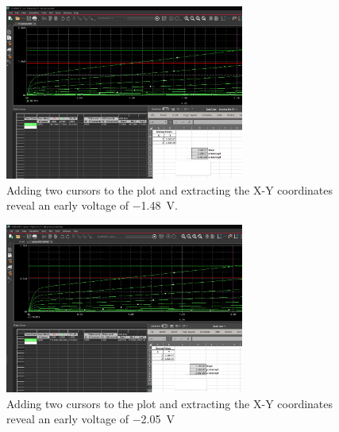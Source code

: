 \documentclass{article}
\begin{document}
	\begin{figure}[H]
	    \centering
	    \includegraphics[width=0.7\textwidth]{nmos-early}
	    \caption{Adding two cursors to the plot and extracting the X-Y coordinates reveal an early voltage of \SI{-1.48}{\volt}.}
	\end{figure}


	\begin{figure}[H]
	    \centering
	    \includegraphics[width=0.7\textwidth]{pmos-early}
	    \caption{Adding two cursors to the plot and extracting the X-Y coordinates reveal an early voltage of \SI{-2.05}{\volt}}
	\end{figure}
	
\end{document}
